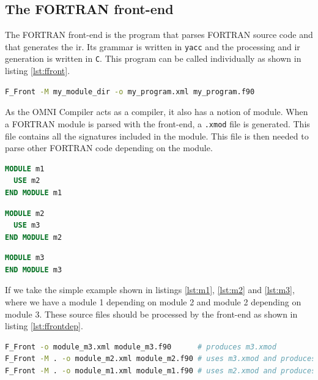 \documentclass[a4paper, 11pt]{report}
\def\omni{OMNI Compiler\xspace}
\begin{document}
\subsection{The FORTRAN front-end}
The FORTRAN front-end is the program that parses FORTRAN source code and that
generates the \gls{ir}. Its grammar is written in \lstinline|yacc| and the
processing and \gls{ir} generation is written in \lstinline|C|. This program
can be called individually as shown in listing \ref{lst:ffront}.

\begin{lstlisting}[label=lst:ffront, language=Bash, caption=Call F\_Front]
F_Front -M my_module_dir -o my_program.xml my_program.f90
\end{lstlisting}

As the \omni acts as a compiler, it also has a notion of module. When a FORTRAN
module is parsed with the front-end, a \lstinline|.xmod| file is generated.
This file contains all the signatures included in the module. This file is then
needed to parse other FORTRAN code depending on the module.

\begin{lstlisting}[label=lst:m1, language=Fortran, caption=module\_m1.f90]
MODULE m1
  USE m2
END MODULE m1
\end{lstlisting}

\begin{lstlisting}[label=lst:m2, language=Fortran, caption=module\_m2.f90]
MODULE m2
  USE m3
END MODULE m2
\end{lstlisting}

\begin{lstlisting}[label=lst:m3, language=Fortran, caption=module\_m3.f90]
MODULE m3
END MODULE m3
\end{lstlisting}

If we take the simple example shown in listings \ref{lst:m1}, \ref{lst:m2} and
\ref{lst:m3}, where we have a module 1 depending on module 2 and module 2
depending on module 3. These source files should be processed by the front-end
as shown in listing \ref{lst:ffrontdep}.

\begin{lstlisting}[label=lst:ffrontdep, language=Bash, caption=Parse module with dependencies]
F_Front -o module_m3.xml module_m3.f90      # produces m3.xmod
F_Front -M . -o module_m2.xml module_m2.f90 # uses m3.xmod and produces m2.xmod
F_Front -M . -o module_m1.xml module_m1.f90 # uses m2.xmod and produces m1.xmod
\end{lstlisting}
\end{document}
